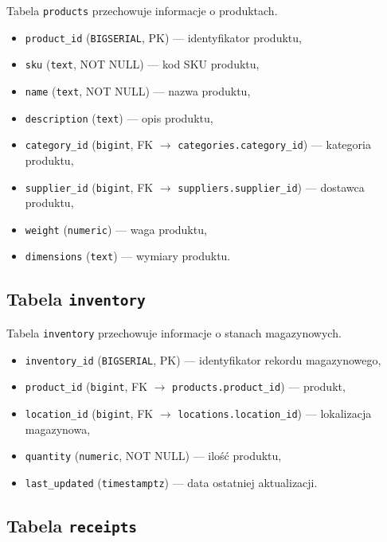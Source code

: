 Tabela \texttt{products} przechowuje informacje o produktach.
\begin{itemize}
    \item \texttt{product\_id} (\texttt{BIGSERIAL}, PK) — identyfikator produktu,
    \item \texttt{sku} (\texttt{text}, NOT NULL) — kod SKU produktu,
    \item \texttt{name} (\texttt{text}, NOT NULL) — nazwa produktu,
    \item \texttt{description} (\texttt{text}) — opis produktu,
    \item \texttt{category\_id} (\texttt{bigint}, FK $\rightarrow$ \texttt{categories.category\_id}) — kategoria produktu,
    \item \texttt{supplier\_id} (\texttt{bigint}, FK $\rightarrow$ \texttt{suppliers.supplier\_id}) — dostawca produktu,
    \item \texttt{weight} (\texttt{numeric}) — waga produktu,
    \item \texttt{dimensions} (\texttt{text}) — wymiary produktu.
\end{itemize}

\subsection{Tabela \texttt{inventory}}

Tabela \texttt{inventory} przechowuje informacje o stanach magazynowych.
\begin{itemize}
    \item \texttt{inventory\_id} (\texttt{BIGSERIAL}, PK) — identyfikator rekordu magazynowego,
    \item \texttt{product\_id} (\texttt{bigint}, FK $\rightarrow$ \texttt{products.product\_id}) — produkt,
    \item \texttt{location\_id} (\texttt{bigint}, FK $\rightarrow$ \texttt{locations.location\_id}) — lokalizacja magazynowa,
    \item \texttt{quantity} (\texttt{numeric}, NOT NULL) — ilość produktu,
    \item \texttt{last\_updated} (\texttt{timestamptz}) — data ostatniej aktualizacji.
\end{itemize}

\subsection{Tabela \texttt{receipts}}

